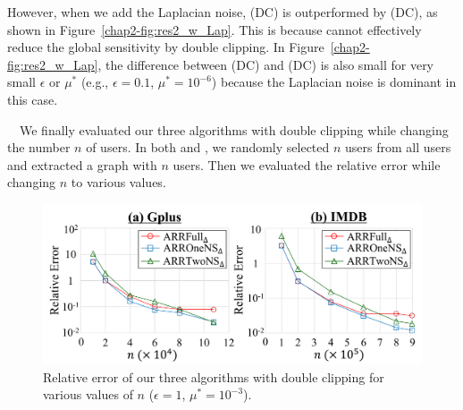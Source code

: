 However, when we add the Laplacian noise, \AlgThree{} (DC) is outperformed by \AlgTwo{} (DC), as shown in Figure~\ref{chap2-fig:res2_w_Lap}. 
This is because \AlgThree{} cannot effectively reduce the global sensitivity by double clipping. 
In Figure~\ref{chap2-fig:res2_w_Lap}, the difference between \AlgTwo{} (DC) and \AlgOne{} (DC) is also small for very small $\epsilon$ or $\mu^*$ (e.g., $\epsilon=0.1$, $\mu^*=10^{-6}$) because the Laplacian noise is dominant in this case. 

\smallskip
{}~~We 
finally 
evaluated our three algorithms with double clipping while changing the number $n$ of users. 
In both \GPlus{} and \IMDB{}, we randomly selected $n$ users from all users and extracted a graph with $n$ users. 
Then we evaluated the relative error while changing $n$ to various values.

\begin{figure}[t]
  \centering
  \includegraphics[width=0.99\linewidth]{fig/res3_n.pdf}
  
  \caption[Relative error of our three algorithms with double clipping for various values of $n$.]
	{Relative error of our three algorithms with double clipping for various values of $n$ 
  ($\epsilon=1$, $\mu^*=10^{-3}$).} 
  \label{chap2-fig:res3_n}
\end{figure}

